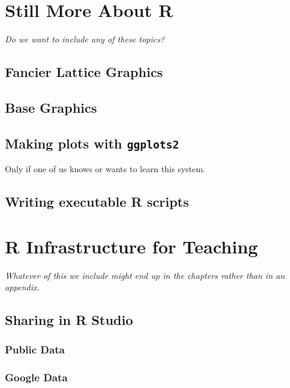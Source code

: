 \chapter{Still More About R}




\emph{Do we want to include any of these topics?}

\section{Fancier Lattice Graphics}

\section{Base Graphics}

\section{Making plots with \texttt{ggplots2}}

Only if one of us knows or wants to learn this system.

\section{Writing executable R scripts}

\chapter{R Infrastructure for Teaching}

\emph{Whatever of this we include might end up in the chapters rather than in 
an appendix.}

\section{Sharing in R Studio}
\subsection{Public Data}
\subsection{Google Data}

